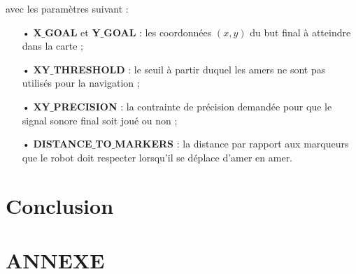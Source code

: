 \documentclass[10pt,a4paper]{article}
\begin{document}
\noindent avec les paramètres suivant : 
\begin{itemize}
\item[•] \textbf{X$\_$GOAL} et \textbf{Y$\_$GOAL} : les coordonnées $(x,y)$ du but final à atteindre dans la carte ; 
\item[•] \textbf{XY$\_$THRESHOLD} : le seuil à partir duquel les amers ne sont pas utilisés pour la navigation ; 
\item[•] \textbf{XY$\_$PRECISION} : la contrainte de précision demandée pour que le signal sonore final soit joué ou non ; 
\item[•] \textbf{DISTANCE$\_$TO$\_$MARKERS} : la distance par rapport aux marqueurs que le robot doit respecter lorsqu'il se déplace d'amer en amer.
\end{itemize}


\newpage
\section{Conclusion}
\label{sec:conclusion}

\newpage
\listoffigures
\newpage

\section*{ANNEXE}
\end{document}
